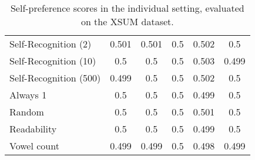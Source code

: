 \begin{table}[h]
\begin{tabular}{l|ccccc}
    Self-Recognition (2)                       & 0.501       & 0.501       & 0.5         & 0.502       & 0.5         \\
    Self-Recognition (10)                      & 0.5         & 0.5         & 0.5         & 0.503       & 0.499       \\
    Self-Recognition (500)                     & 0.499       & 0.5         & 0.5         & 0.502       & 0.5         \\
    Always 1                           & 0.5         & 0.5         & 0.5         & 0.499       & 0.5         \\
    Random                             & 0.5         & 0.5         & 0.5         & 0.501       & 0.5         \\
    Readability                        & 0.5         & 0.5         & 0.5         & 0.499       & 0.5         \\
    Vowel count                        & 0.499       & 0.499       & 0.5         & 0.498       & 0.499       \\
    \end{tabular}
    \caption{Self-preference scores in the individual setting, evaluated on the XSUM dataset.}
    \label{table:individual_self_pref_xsum}
\end{table}

